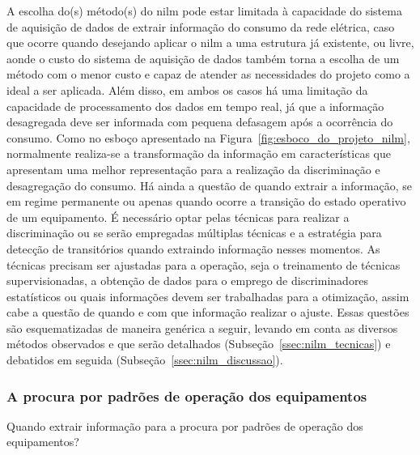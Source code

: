 A escolha do(s) método(s) do \acs{nilm} pode estar limitada à
capacidade do sistema de aquisição de dados de extrair informação do
consumo da rede elétrica, caso que ocorre quando desejando aplicar o
\acs{nilm} a uma estrutura já existente, ou livre, aonde o custo do
sistema de aquisição de dados também torna a escolha de um método com o menor custo e capaz de atender as necessidades do
projeto como a ideal a ser aplicada. Além disso, em ambos os casos há
uma limitação da capacidade de processamento dos dados em tempo real,
já que a informação desagregada deve ser informada com pequena
defasagem após a ocorrência do consumo. Como no esboço apresentado na
Figura~\ref{fig:esboco_do_projeto_nilm}, normalmente realiza-se a
transformação da informação em características que apresentam uma
melhor representação para a realização da discriminação e desagregação
do consumo. Há ainda a questão de quando extrair a informação, se em
regime permanente ou apenas quando ocorre a transição do estado
operativo de um equipamento. É necessário optar pelas técnicas para
realizar a discriminação ou se serão empregadas múltiplas técnicas e a
estratégia para detecção de transitórios quando extraindo informação
nesses momentos. As técnicas precisam ser ajustadas para a operação,
seja o treinamento de técnicas supervisionadas, a obtenção de dados
para o emprego de discriminadores estatísticos ou quais informações
devem ser trabalhadas para a otimização, assim cabe a questão de
quando e com que informação realizar o ajuste. Essas questões são
esquematizadas de maneira genérica a seguir, levando em conta as
diversos métodos observados e que serão detalhados
(Subseção~\ref{ssec:nilm_tecnicas}) e debatidos em seguida
(Subseção~\ref{ssec:nilm_discussao}).

\subsubsection{A procura por padrões de operação dos
equipamentos}
\label{top:procura_padroes}

Quando extrair informação para a procura por padrões de operação dos
equipamentos?

